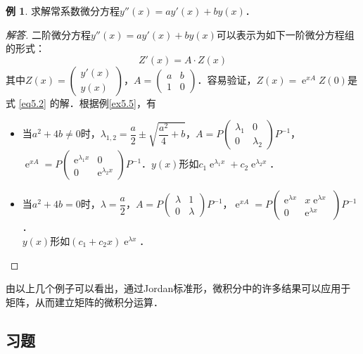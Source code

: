 \documentclass[a4paper,fontset=windows]{ctexbook}
\theoremstyle{definition}
\newtheorem{example}{例}[chapter]
\DeclareMathOperator{\E}{e}
\begin{document}
\begin{example}
求解常系数微分方程$y''(x)=ay'(x)+by(x)$．
\end{example}

\begin{proof}[解答]
二阶微分方程$y''(x)=ay'(x)+by(x)$可以表示为如下一阶微分方程组的形式：
\begin{equation}\label{eq5.2}
Z'(x)=A\cdot Z(x)
\end{equation}
其中$Z(x)=\begin{pmatrix}y'(x) \\ y(x)\end{pmatrix}$，$A=\begin{pmatrix}a&b \\ 1&0\end{pmatrix}$．容易验证，$Z(x)=\E^{xA}Z(0)$是式 \eqref{eq5.2} 的解．根据例\ref{ex5.5}，有
\begin{itemize}
\item 当$a^2+4b\ne 0$时，$\lambda_{1,2}=\dfrac{a}{2}\pm\sqrt{\dfrac{a^2}{4}+b}$，$A=P\begin{pmatrix}\lambda_1&0 \\ 0&\lambda_2\end{pmatrix}P^{-1}$，$\E^{xA}=P\begin{pmatrix}\E^{\lambda_1x}&0 \\ 0&\E^{\lambda_2x}\end{pmatrix}P^{-1}$．$y(x)$形如$c_1\E^{\lambda_1x}+c_2\E^{\lambda_2x}$．

\item 当$a^2+4b=0$时，$\lambda=\dfrac{a}{2}$，$A=P\begin{pmatrix}\lambda&1 \\ 0&\lambda\end{pmatrix}P^{-1}$，$\E^{xA}=P\begin{pmatrix}\E^{\lambda x}&x\E^{\lambda x} \\ 0&\E^{\lambda x}\end{pmatrix}P^{-1}$．\\ $y(x)$形如$(c_1+c_2x)\E^{\lambda x}$．\qedhere
\end{itemize}
\end{proof}

由以上几个例子可以看出，通过Jordan标准形，微积分中的许多结果可以应用于矩阵，从而建立矩阵的微积分运算．

\subsection*{习题}
\end{document}

